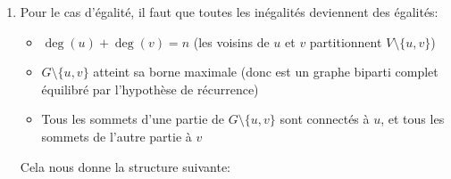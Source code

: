 \begin{td-sol}[]
\begin{enumerate}
\begin{itemize}
            \item Si \(n = 2k + 1\) est impair, alors \(n-2\) est impair. Par hypothèse de récurrence,
            on a
            \begin{equation*}
                m' \leq \frac{{(n-2)}^2-1}{4}
            \end{equation*}
            En utilisant notre formule précédente, on a
            \begin{equation*}
                \begin{aligned}
                    m
                    &= \deg(u) + \deg(v) - 1 + m' \\
                    &\leq n - 1 + \frac{{(n-2)}^2 - 1}{4} \\
                    &\leq 2k + 1 - 1 + \frac{{(2k-1)}^2 - 1}{4} \\
                    &\leq 2k + \frac{4k^2 - 4k + 1 - 1}{4} \\
                    &\leq 2k + k^2 - k \\
                    &\leq k^2 + k \\
                    &\leq {(\frac{n-1}{2})}^2 + \frac{n-1}{2} \\
                    &\leq \frac{n^2 - 2n + 1 + 2n - 2}{4} \\
                    &\leq \frac{n^2 - 1}{4}
                \end{aligned}
            \end{equation*}
            Donc la formule est vérifiée pour \(n\) impair.
        \end{itemize}
        On a donc montré que si \(G\) est un graphe sans triangles
        alors le nombre d'arêtes de \(G\) est au plus
        \(\frac{n^2}{4}\) si \(n\) est pair et 
        au plus \(\frac{n^2-1}{4}\) si \(n\) est impair.

        \item Pour le cas d'égalité, il faut que toutes les inégalités deviennent des égalités:
        \begin{itemize}
            \item \(\deg(u) + \deg(v) = n\) (les voisins de \(u\) et \(v\) partitionnent \(V\setminus\{u,v\}\))
            \item \(G \setminus \{u,v\}\) atteint sa borne maximale (donc est un graphe biparti complet équilibré par l'hypothèse de récurrence)
            \item Tous les sommets d'une partie de \(G \setminus \{u,v\}\) sont connectés à \(u\), et tous les sommets de l'autre partie à \(v\)
        \end{itemize}
        Cela nous donne la structure suivante:


\end{enumerate}
\end{td-sol}
